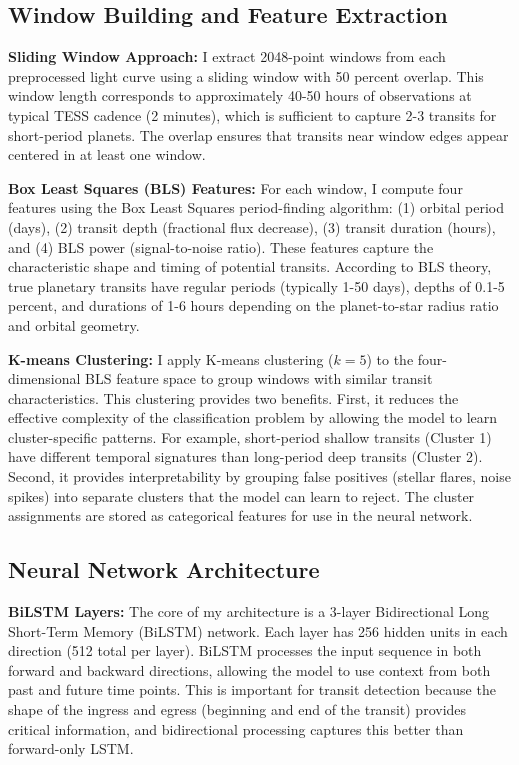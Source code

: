 \documentclass[letterpaper]{article}
\begin{document}
\subsection{Window Building and Feature Extraction}

\textbf{Sliding Window Approach:} I extract 2048-point windows from each preprocessed light curve using a sliding window with 50 percent overlap. This window length corresponds to approximately 40-50 hours of observations at typical TESS cadence (2 minutes), which is sufficient to capture 2-3 transits for short-period planets. The overlap ensures that transits near window edges appear centered in at least one window.

\textbf{Box Least Squares (BLS) Features:} For each window, I compute four features using the Box Least Squares period-finding algorithm: (1) orbital period (days), (2) transit depth (fractional flux decrease), (3) transit duration (hours), and (4) BLS power (signal-to-noise ratio). These features capture the characteristic shape and timing of potential transits. According to BLS theory, true planetary transits have regular periods (typically 1-50 days), depths of 0.1-5 percent, and durations of 1-6 hours depending on the planet-to-star radius ratio and orbital geometry.

\textbf{K-means Clustering:} I apply K-means clustering ($k=5$) to the four-dimensional BLS feature space to group windows with similar transit characteristics. This clustering provides two benefits. First, it reduces the effective complexity of the classification problem by allowing the model to learn cluster-specific patterns. For example, short-period shallow transits (Cluster 1) have different temporal signatures than long-period deep transits (Cluster 2). Second, it provides interpretability by grouping false positives (stellar flares, noise spikes) into separate clusters that the model can learn to reject. The cluster assignments are stored as categorical features for use in the neural network.

\subsection{Neural Network Architecture}

\textbf{BiLSTM Layers:} The core of my architecture is a 3-layer Bidirectional Long Short-Term Memory (BiLSTM) network. Each layer has 256 hidden units in each direction (512 total per layer). BiLSTM processes the input sequence in both forward and backward directions, allowing the model to use context from both past and future time points. This is important for transit detection because the shape of the ingress and egress (beginning and end of the transit) provides critical information, and bidirectional processing captures this better than forward-only LSTM.
\end{document}
